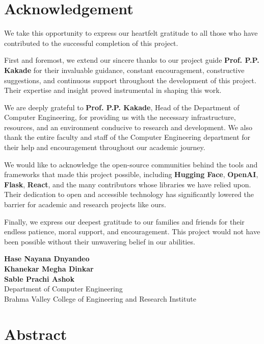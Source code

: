 \documentclass[12pt, a4paper]{report}
\newcommand{\collegename}{Brahma Valley College of Engineering and Research Institute}
\begin{document}
\chapter*{Acknowledgement}

We take this opportunity to express our heartfelt gratitude to all those who have contributed to the successful completion of this project.

First and foremost, we extend our sincere thanks to our project guide \textbf{{Prof. P.P. Kakade}} for their invaluable guidance, constant encouragement, constructive suggestions, and continuous support throughout the development of this project. Their expertise and insight proved instrumental in shaping this work.

We are deeply grateful to \textbf{{Prof. P.P. Kakade}}, Head of the Department of Computer Engineering, for providing us with the necessary infrastructure, resources, and an environment conducive to research and development. We also thank the entire faculty and staff of the Computer Engineering department for their help and encouragement throughout our academic journey.

We would like to acknowledge the open-source communities behind the tools and frameworks that made this project possible, including \textbf{Hugging Face}, \textbf{OpenAI}, \textbf{Flask}, \textbf{React}, and the many contributors whose libraries we have relied upon. Their dedication to open and accessible technology has significantly lowered the barrier for academic and research projects like ours.

Finally, we express our deepest gratitude to our families and friends for their endless patience, moral support, and encouragement. This project would not have been possible without their unwavering belief in our abilities.

\vspace{1.5cm}
\begin{flushright}
\textbf{{{Hase Nayana Dnyandeo}}}\\
\textbf{{Khanekar Megha Dinkar}}\\
\textbf{{Sable Prachi Ashok}}\\[0.5cm]
Department of Computer Engineering\\
\collegename\\
\end{flushright}

\newpage
\chapter*{Abstract}
\end{document}
